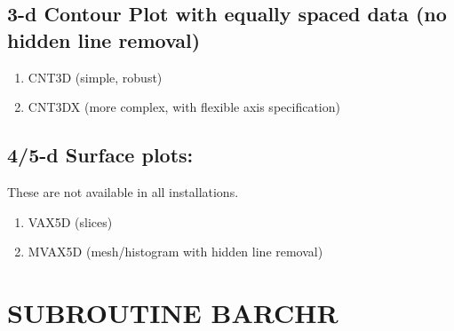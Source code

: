 \documentclass[11pt]{report}
\begin{document}
\subsection{3-d Contour Plot with equally spaced data (no hidden line removal)}
\begin{enumerate}
\item  CNT3D  (simple, robust)
\item  CNT3DX (more complex, with flexible axis specification)
\end{enumerate}

\subsection{4/5-d Surface plots:}
These are not available in all installations.
\begin{enumerate}
\item  VAX5D  (slices)
\item  MVAX5D  (mesh/histogram with hidden line removal)
\end{enumerate}


\newpage
\section{SUBROUTINE BARCHR}
\end{document}
